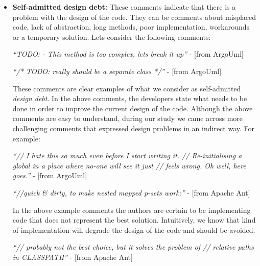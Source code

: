 \begin{itemize}
  \item \textbf{Self-admitted design debt:} These comments indicate that there is a problem with the design of the code. They can be comments about misplaced code, lack of abstraction, long methods, poor implementation, workarounds or a temporary solution. Lets consider the following comments:
  
  \vspace{1mm}
  \begin{displayquote}
     \textit{``TODO: - This method is too complex, lets break it up''} - [from ArgoUml]
     
     \vspace{1mm}

     \textit{``/* TODO: really should be a separate class */''} - [from ArgoUml]
  \end{displayquote}
  \vspace{1mm}

These comments are clear examples of what we consider as self-admitted \emph{design debt}. In the above comments, the developers state what needs to be done in order to improve the current design of the code. Although the above comments are easy to understand, during our study we came across more challenging comments that expressed design problems in an indirect way. For example: 
  
  \vspace{1mm}
  \begin{displayquote}
     \textit{``// I hate this so much even before I start writing it. // Re-initialising a global in a place where no-one will see it just // feels wrong.  Oh well, here goes.''} - [from ArgoUml]

     \vspace{1mm}

     \textit{``//quick \& dirty, to make nested mapped p-sets work:''} - [from Apache Ant]
  \end{displayquote}
  \vspace{1mm}

In the above example comments the authors are certain to be implementing code that does not represent the best solution. Intuitively, we know that kind of implementation will degrade the design of the code and should be avoided. 

  \vspace{1mm}
  \begin{displayquote}
      \textit{``// probably not the best choice, but it solves the problem of // relative paths in CLASSPATH''} - [from Apache Ant]


\end{displayquote}
\end{itemize}
